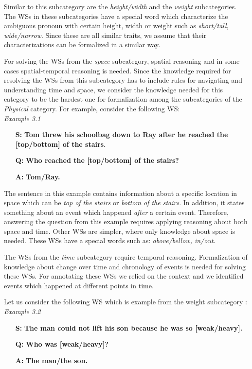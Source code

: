 Similar to this subcategory are the \textit{height/width} and the \textit{weight} subcategories. The WSs in these subcategories have a special word which characterize the ambiguous pronoun with certain height, width or weight such as \textit{short/tall}, \textit{wide/narrow}. Since these are all similar traits, we assume that their characterizations can be formalized in a similar way.


For solving the WSs from the \textit{space} subcategory, spatial reasoning and in some cases spatial-temporal reasoning is needed. Since the knowledge required for resolving the WSs from this subcategory has to include rules for navigating and understanding time and space, we consider the knowledge needed for this category to be the hardest one for formalization among the subcategories of the \textit{Physical} category.
For example, consider the following WS:\\
\textit{Example 3.1} 
\begin{itemize} 
	\item[\textbf{S:}] \textbf{Tom threw his schoolbag down to Ray after he reached the [top/bottom] of the stairs.}
	\item[\textbf{Q:}] \textbf{Who reached the [top/bottom] of the stairs?}
	\item[\textbf{A:}] \textbf{Tom/Ray.}
\end{itemize}

The sentence in this example contains information about a specific location in space which can be \textit{top of the stairs} or \textit{bottom of the stairs}. In addition, it states something about an event which happened \textit{after} a certain event. Therefore, answering the question from this example requires applying reasoning about both space and time. Other WSs are simpler, where only knowledge about space is needed. These WSs have a special words such as: \textit{above/bellow, in/out}.

The WSs from the \textit{time} subcategory require temporal reasoning. 
Formalization of knowledge about change over time and chronology of events is needed for solving these WSs. For annotating these WSs we relied on the context and we identified events which happened at different points in time.


Let us consider the following WS which is example from the weight subcategory : \\
\textit{Example 3.2}
\begin{itemize} \label{Ex2}
	\item[\textbf{S:}] \textbf{The man could not lift his son because he was so [weak/heavy].}
	\item[\textbf{Q:}] \textbf{Who was [weak/heavy]?}
	\item[\textbf{A:}] \textbf{The man/the son.}
\end{itemize}


